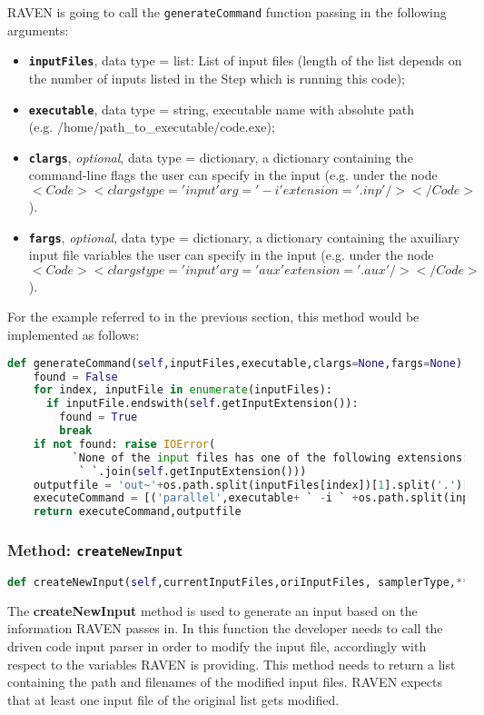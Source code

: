 RAVEN is going to call the \texttt{generateCommand} function passing in the following arguments:
\begin{itemize}
  \item \textbf{\texttt{inputFiles}}, data type = list: List of input files (length of the list depends on the
           number of inputs listed in the Step which is running this code);
  \item \textbf{\texttt{executable}}, data type = string, executable name with absolute
            path \\(e.g. /home/path\_to\_executable/code.exe);
  \item  \textbf{\texttt{clargs}}, \emph{optional}, data type = dictionary, a dictionary containing the command-line flags the
               user can specify in the input (e.g. under the node $<Code><clargs type='input' arg='-i' extension='.inp'/></Code>$).
  \item  \textbf{\texttt{fargs}}, \emph{optional}, data type = dictionary, a dictionary containing the axuiliary input file variables the
               user can specify in the input (e.g. under the node $<Code><clargs type='input' arg='aux' extension='.aux'/></Code>$).
\end{itemize}
For the example referred to in the previous section, this method would be implemented as follows:
\newline
\begin{lstlisting}[language=python]
  def generateCommand(self,inputFiles,executable,clargs=None,fargs=None):
    found = False
    for index, inputFile in enumerate(inputFiles):
      if inputFile.endswith(self.getInputExtension()):
        found = True
        break
    if not found: raise IOError(
          `None of the input files has one of the following extensions: ` +
           ` `.join(self.getInputExtension()))
    outputfile = 'out~'+os.path.split(inputFiles[index])[1].split('.')[0]
    executeCommand = [('parallel',executable+ ` -i ` +os.path.split(inputFiles[index])[1])]
    return executeCommand,outputfile
\end{lstlisting}


\subsubsection{Method: \texttt{createNewInput}}
\label{subsubsec:createNewInput}
\begin{lstlisting}[language=python]
def createNewInput(self,currentInputFiles,oriInputFiles, samplerType,**Kwargs)
\end{lstlisting}
The \textbf{createNewInput} method is used to generate an input based
on the information RAVEN passes in. In this function the developer needs to
call the driven code input parser in order to modify the input file, accordingly with
respect to the variables RAVEN is providing. This method needs to return a list containing
the path and filenames of the modified input files. \nb RAVEN expects that at least one input
file of the original list gets modified.

